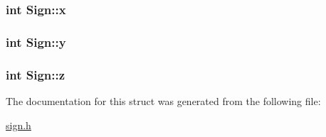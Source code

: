 \subsubsection[{\texorpdfstring{x}{x}}]{\setlength{\rightskip}{0pt plus 5cm}int Sign\+::x}\hypertarget{structSign_a9672fe58fa3a1d75c9511fe8259eb4e6}{}\label{structSign_a9672fe58fa3a1d75c9511fe8259eb4e6}
\subsubsection[{\texorpdfstring{y}{y}}]{\setlength{\rightskip}{0pt plus 5cm}int Sign\+::y}\hypertarget{structSign_afdd7a7b76acc62dfd45965caed37c3f3}{}\label{structSign_afdd7a7b76acc62dfd45965caed37c3f3}
\subsubsection[{\texorpdfstring{z}{z}}]{\setlength{\rightskip}{0pt plus 5cm}int Sign\+::z}\hypertarget{structSign_a5eb6412ecae2da81951ffdf073a994ed}{}\label{structSign_a5eb6412ecae2da81951ffdf073a994ed}


The documentation for this struct was generated from the following file\+:\begin{DoxyCompactItemize}
\item 
\hyperlink{sign_8h}{sign.\+h}\end{DoxyCompactItemize}
